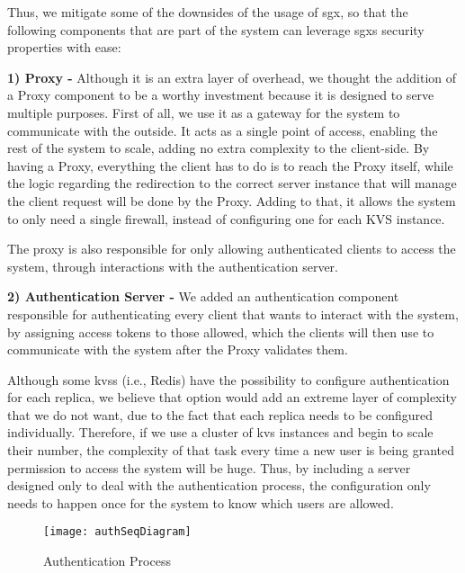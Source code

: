 Thus, we mitigate some of the downsides of the usage of \gls{sgx}, so that the following components that are part of the system can leverage \gls{sgx}s security properties with ease:

\vspace{5mm} 

\textbf{1) Proxy -}
Although it is an extra layer of overhead, we thought the addition of a Proxy component to be a worthy investment because it is designed to serve multiple purposes. 
First of all, we use it as a gateway for the system to communicate with the outside. It acts as a single point of access, enabling the rest of the system to scale, adding no extra complexity to the client-side. By having a Proxy, everything the client has to do is to reach the Proxy itself, while the logic regarding the redirection to the correct server instance that will manage the client request will be done by the Proxy. Adding to that, it allows the system to only need a single firewall, instead of configuring one for each KVS instance.

The proxy is also responsible for only allowing authenticated clients to access the system, through interactions with the authentication server. 

\vspace{5mm} 

\textbf{2) Authentication Server -} 
We added an authentication component responsible for authenticating every client that wants to interact with the system, by assigning access tokens to those allowed, which the clients will then use to communicate with the system after the Proxy validates them.
 
Although some \gls{kvs}s (i.e., Redis) have the possibility to configure authentication for each replica, we believe that option would add an extreme layer of complexity that we do not want, due to the fact that each replica needs to be configured individually. Therefore, if we use a cluster of \gls{kvs} instances and begin to scale their number, the complexity of that task every time a new user is being granted permission to access the system will be huge. Thus, by including a server designed only to deal with the authentication process, the configuration only needs to happen once for the system to know which users are allowed.



\vspace{3mm}

\begin{figure}[htbp]
	\centering
	{\texttt{[image: authSeqDiagram]}}
	\caption{Authentication Process}
	\label{fig:authProcess}
\end{figure}

